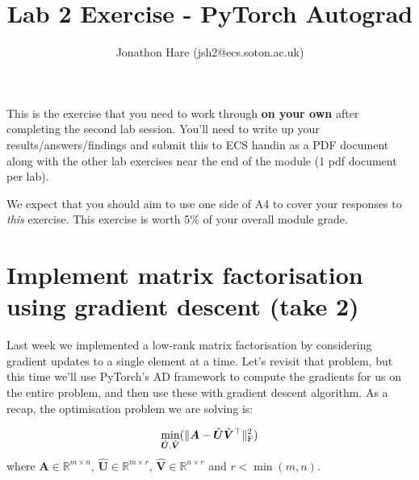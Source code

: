 \documentclass[a4paper]{article}
\begin{document}
\lstset{language=Python,upquote=true}

\setlength{\leftskip}{20pt}
\title{Lab 2 Exercise - PyTorch Autograd}
\author{Jonathon Hare (jsh2@ecs.soton.ac.uk)}

\maketitle


This is the exercise that you need to work through \textbf{on your own} after completing the second lab session. You'll need to write up your results/answers/findings and submit this to ECS handin as a PDF document along with the other lab exercises near the end of the module (1 pdf document per lab). 

We expect that you should aim to use one side of A4 to cover your responses to \emph{this} exercise. This exercise is worth 5\% of your overall module grade.

\section{Implement matrix factorisation using gradient descent (take 2)}\label{sgd}

Last week we implemented a low-rank matrix factorisation by considering gradient updates to a single element at a time. Let's revisit that problem, but this time we'll use PyTorch's AD framework to compute the gradients for us on the entire problem, and then use these with gradient descent algorithm. As a recap, the optimisation problem we are solving is:

\begin{equation}
	\min\limits_{\hat{\bm U}, \hat{\bm V}}( \| \bm A - \hat{\bm U}\hat{\bm V}^\top \|_{\rm F}^2 )
\end{equation}
where $\bm A \in \mathbb{R}^{m \times n}$, $\hat{\bm U} \in \mathbb{R}^{m \times r}$, $\hat{\bm V} \in \mathbb{R}^{n \times r}$ and $r<\min(m,n)$. 
\end{document}
